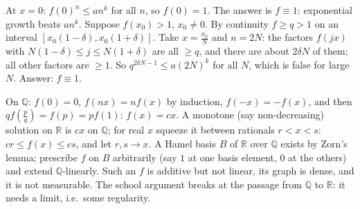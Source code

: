 \documentclass[11pt,a4paper]{article}
\begin{document}
 At \(x=0\): \(f(0)^n\le an^k\) for all \(n\), so \(f(0)=1\). The answer is \(f\equiv1\): exponential growth beats \(an^k\).
 Suppose \(f(x_0)\gt1\), \(x_0\ne0\). By continuity \(f\ge q\gt1\) on an interval \([x_0(1-\delta),x_0(1+\delta)]\). Take \(x=\frac{x_0}N\) and \(n=2N\): the factors \(f(jx)\) with \(N(1-\delta)\le j\le N(1+\delta)\) are all \(\ge q\), and there are about \(2\delta N\) of them; all other factors are \(\ge1\).
 So \(q^{2\delta N-1}\le a(2N)^k\) for all \(N\), which is false for large \(N\). Answer: \(f\equiv1\).

 On \(\mathbb Q\): \(f(0)=0\), \(f(nx)=nf(x)\) by induction, \(f(-x)=-f(x)\), and then \(qf(\frac pq)=f(p)=pf(1)\): \(f(x)=cx\).
 A monotone (say non-decreasing) solution on \(\mathbb R\) is \(cx\) on \(\mathbb Q\); for real \(x\) squeeze it between rationals \(r\lt x\lt s\): \(cr\le f(x)\le cs\), and let \(r,s\to x\).
 A Hamel basis \(B\) of \(\mathbb R\) over \(\mathbb Q\) exists by Zorn's lemma; prescribe \(f\) on \(B\) arbitrarily (say \(1\) at one basis element, \(0\) at the others) and extend \(\mathbb Q\)-linearly. Such an \(f\) is additive but not linear, its graph is dense, and it is not measurable. The school argument breaks at the passage from \(\mathbb Q\) to \(\mathbb R\): it needs a limit, i.e.\ some regularity.
\end{document}
